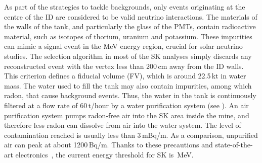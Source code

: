 As part of the strategies to tackle backgrounds, only events originating at the centre %
of the ID are considered to be valid neutrino interactions.
The materials of the walls of the tank, and particularly the glass of the PMTs, contain radioactive material, %
such as isotopes of thorium, uranium and potassium.
These impurities can mimic a signal event in the MeV energy region, crucial for solar neutrino studies.
The selection algorithm in most of the SK analyses simply discards any reconstructed event %
with the vertex less than 200\,cm away from the ID walls.
This criterion defines a fiducial volume (FV), which is around 22.5\,kt in water mass.
The water used to fill the tank may also contain impurities, among which radon, that cause background events.
Thus, the water in the tank is continuously filtered at a flow rate of 60\,t/hour by a water purification system (see ).
An air purification system pumps radon-free air into the SK area inside the mine, %
and therefore less radon can dissolve from air into the water system.
The level of contamination reached is usually less than 3\,mBq/m.
As a comparison, unpurified air can peak at about 1200\,Bq/m.
Thanks to these precautions and state-of-the-art electronics~\cite{Nishino:2009zu}, the current energy threshold for SK is \,MeV.

